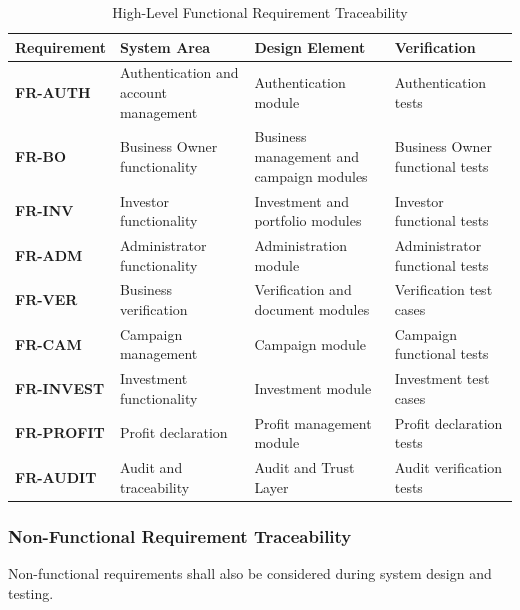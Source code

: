 \begin{table}[H]
\centering
\small

\begin{tabularx}{\textwidth}{>{\bfseries}l X X X}
\toprule
Requirement & System Area & Design Element & Verification \\
\midrule

FR-AUTH &
Authentication and account management &
Authentication module &
Authentication tests \\

FR-BO &
Business Owner functionality &
Business management and campaign modules &
Business Owner functional tests \\

FR-INV &
Investor functionality &
Investment and portfolio modules &
Investor functional tests \\

FR-ADM &
Administrator functionality &
Administration module &
Administrator functional tests \\

FR-VER &
Business verification &
Verification and document modules &
Verification test cases \\

FR-CAM &
Campaign management &
Campaign module &
Campaign functional tests \\

FR-INVEST &
Investment functionality &
Investment module &
Investment test cases \\

FR-PROFIT &
Profit declaration &
Profit management module &
Profit declaration tests \\

FR-AUDIT &
Audit and traceability &
Audit and Trust Layer &
Audit verification tests \\

\bottomrule
\end{tabularx}

\caption{High-Level Functional Requirement Traceability}
\label{tab:functional_traceability}

\end{table}

\subsubsection{Non-Functional Requirement Traceability}

Non-functional requirements shall also be considered during system
design and testing.

